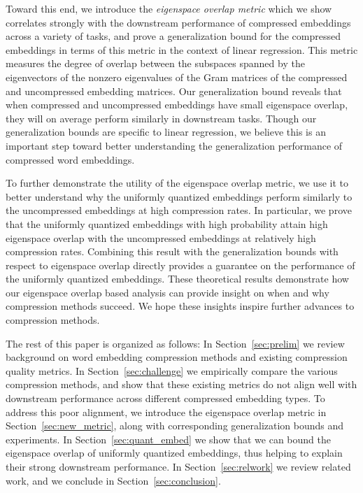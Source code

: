 Toward this end, we introduce the \textit{eigenspace overlap metric} which we show correlates strongly with the downstream performance of compressed embeddings across a variety of tasks, and prove a generalization bound for the compressed embeddings in terms of this metric in the context of linear regression.
This metric measures the degree of overlap between the subspaces spanned by the eigenvectors of the nonzero eigenvalues of the Gram matrices of the compressed and uncompressed embedding matrices. %
Our generalization bound reveals that when compressed and uncompressed embeddings have small eigenspace overlap, they will on average perform similarly in downstream tasks.
Though our generalization bounds are specific to linear regression, we believe this is an important step toward better understanding the generalization performance of compressed word embeddings.

To further demonstrate the utility of the eigenspace overlap metric, we use it to better understand why the uniformly quantized embeddings perform similarly to the uncompressed embeddings at high compression rates.
In particular, we prove that the uniformly quantized embeddings with high probability attain high eigenspace overlap with the uncompressed embeddings at relatively high compression rates.
Combining this result with the generalization bounds with respect to eigenspace overlap directly provides a guarantee on the performance of the uniformly quantized embeddings.
These theoretical results demonstrate how our eigenspace overlap based analysis can provide insight on when and why compression methods succeed.
We hope these insights inspire further advances to compression methods.

The rest of this paper is organized as follows:
In Section~\ref{sec:prelim} we review background on word embedding compression methods and existing compression quality metrics.
In Section~\ref{sec:challenge} we empirically compare the various compression methods, and show that these existing metrics do not align well with downstream performance across different compressed embedding types.
To address this poor alignment, we introduce the eigenspace overlap metric in Section~\ref{sec:new_metric}, along with corresponding generalization bounds and experiments.
In Section~\ref{sec:quant_embed} we show that we can bound the eigenspace overlap of uniformly quantized embeddings, thus helping to explain their strong downstream performance.
In Section~\ref{sec:relwork} we review related work, and we conclude in Section~\ref{sec:conclusion}.

